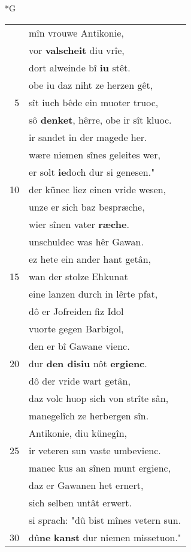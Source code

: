 \documentclass[8pt,a4paper,notitlepage]{article}
\begin{document}
\begin{table}[ht]
\begin{minipage}[t]{0.5\linewidth}
\small
\begin{center}*G
\end{center}
\begin{tabular}{rl}
 & mîn vrouwe Antikonie,\\ 
 & vor \textbf{valscheit} diu vrîe,\\ 
 & dort alweinde bî \textbf{iu} stêt.\\ 
 & obe iu daz niht ze herzen gêt,\\ 
5 & sît iuch bêde ein muoter truoc,\\ 
 & sô \textbf{denket}, hêrre, obe ir sît kluoc.\\ 
 & ir sandet in der magede her.\\ 
 & wære niemen sînes geleites wer,\\ 
 & er solt \textbf{ie}doch dur si genesen."\\ 
10 & der künec liez einen vride wesen,\\ 
 & unze er sich baz bespræche,\\ 
 & wier sînen vater \textbf{ræche}.\\ 
 & unschuldec was hêr Gawan.\\ 
 & ez hete ein ander hant getân,\\ 
15 & wan der stolze Ehkunat\\ 
 & eine lanzen durch in lêrte pfat,\\ 
 & dô er Jofreiden fiz Idol\\ 
 & vuorte gegen Barbigol,\\ 
 & den er bî Gawane vienc.\\ 
20 & dur \textbf{den disiu} nôt \textbf{ergienc}.\\ 
 & dô der vride wart getân,\\ 
 & daz volc huop sich von strîte sân,\\ 
 & manegelîch ze herbergen sîn.\\ 
 & Antikonie, diu künegîn,\\ 
25 & ir veteren sun vaste umbevienc.\\ 
 & manec kus an sînen munt ergienc,\\ 
 & daz er Gawanen het ernert,\\ 
 & sich selben untât erwert.\\ 
 & si sprach: "dû bist mînes vetern sun.\\ 
30 & dû\textbf{ne} \textbf{kanst} dur niemen missetuon."\\ 

\end{tabular}
\end{minipage}
\end{table}
\end{document}
